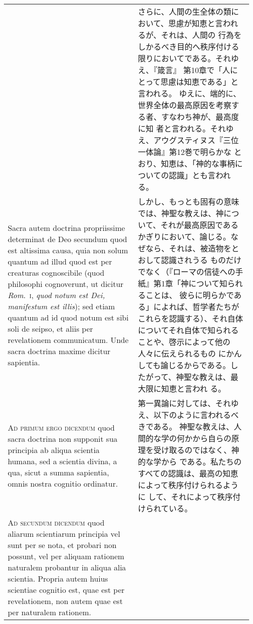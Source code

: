 \documentclass[10pt]{jsarticle} %
\begin{document}
\begin{longtable}{p{21em}p{21em}}
&


さらに、人間の生全体の類において、思慮が知恵と言われるが、それは、人間の
 行為をしかるべき目的へ秩序付ける限りにおいてである。それゆえ、『箴言』
 第10章で「人にとって思慮は知恵である」と言われる。
ゆえに、端的に、世界全体の最高原因を考察する者、すなわち神が、最高度に知
 者と言われる。それゆえ、アウグスティヌス『三位一体論』第12巻で明らかな
 とおり、知恵は、「神的な事柄についての認識」とも言われる。

\\


Sacra autem doctrina propriissime determinat de Deo
secundum quod est altissima causa, quia non solum quantum ad illud quod
est per creaturas cognoscibile (quod philosophi cognoverunt, ut dicitur
{\itshape Rom}.~{\scshape i}, {\itshape quod notum est Dei, manifestum est illis}); sed etiam quantum ad
id quod notum est sibi soli de seipso, et aliis per revelationem
communicatum. Unde sacra doctrina maxime dicitur sapientia.


&

しかし、もっとも固有の意味では、神聖な教えは、神について、それが最高原因である
 かぎりにおいて、論じる。なぜなら、それは、被造物をとおして認識されうる
 ものだけでなく（『ローマの信徒への手紙』第1章「神について知られることは、
 彼らに明らかである」によれば、哲学者たちがこれらを認識する）、それ自体
 についてそれ自体で知られることや、啓示によって他の人々に伝えられるもの
 にかんしても論じるからである。したがって、神聖な教えは、最大限に知恵と言われ
 る。


\\


{\scshape Ad primum ergo dicendum} quod sacra doctrina
non supponit sua principia ab aliqua scientia humana, sed a scientia
divina, a qua, sicut a summa sapientia, omnis nostra cognitio ordinatur.


&

第一異論に対しては、それゆえ、以下のように言われるべきである。
神聖な教えは、人間的な学の何かから自らの原理を受け取るのではなく、神的な学から
 である。私たちのすべての認識は、最高の知恵によって秩序付けられるように
 して、それによって秩序付けられている。


\\


{\scshape Ad secundum dicendum} quod aliarum scientiarum
principia vel sunt per se nota, et probari non possunt, vel per aliquam
rationem naturalem probantur in aliqua alia scientia. Propria autem
huius scientiae cognitio est, quae est per revelationem, non autem quae
est per naturalem rationem. 



\end{longtable}
\end{document}
